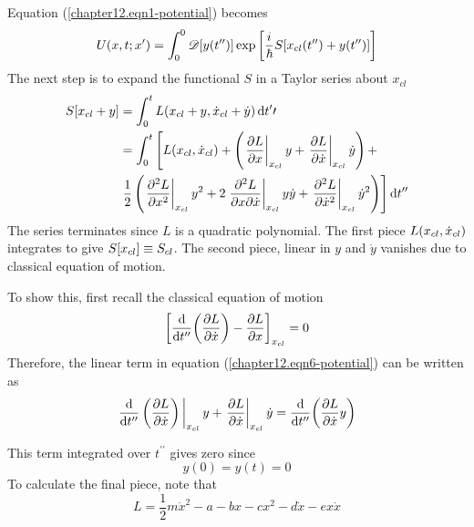 	Equation (\ref{chapter12.eqn1-potential}) becomes
	\begin{equation}
		U\qty(x,t;x^\prime) = \int_{0}^{0} \mathcal{D}\qty[y\qty(t^{\prime\prime})]  \exp\qty[\frac{{i\mkern1mu}}{\hbar} S\qty[x_{cl}\qty(t^{\prime\prime})  +  y\qty(t^{\prime\prime})]]
		\label{chapter12.eqn5-potential}
	\end{equation}
	The next step is to expand the functional $S$ in a Taylor series about $x_{cl}$
	\begin{align}
		\begin{split}
		S\qty[x_{cl} + y] 	&= \int_{0}^{t} L\qty(x_{cl} + y, \dot{x}_{cl} + \dot{y}) \dd{t^\prime\prime}\\
		&=
		\int_{0}^{t} \left[
		L(x_{cl}, \dot{x}_{cl})  + \left(\eval{\pdv{L}{x}}_{x_{cl}} y + \eval{\pdv{L}{\dot{x}}}_{x_{cl}} \dot{y}\right)
		+\right.
		\\ 
		&\left.
		 \frac{1}{2} \left(
		\eval{\pdv[2]{L}{x}}_{x_{cl}} y^2 
		+ 2 \eval{\pdv[2]{L}{x}{\dot{x}}}_{x_{cl}} y\dot{y} 
		+ \eval{\pdv[2]{L}{\dot{x}}}_{x_{cl}} \dot{y}^2		\right)
		\right] \dd{t^{\prime\prime}}
		\end{split}
		\label{chapter12.eqn6-potential}
	\end{align}
	The series terminates since $L$ is a quadratic polynomial.
	The first piece $L\qty(x_{cl}, \dot{x}_{cl})$ integrates to give $S\qty[x_{cl}] \equiv S_{cl}$. The second piece, linear in $y$ and $\dot{y}$ vanishes due to classical equation of motion.
		
		To show this, first recall the classical equation of motion
		\begin{equation}
			\left[
			\dv{t^{\prime\prime}} \qty(\pdv{L}{\dot{x}}) - \pdv{L}{x}
			\right]_{x_{cl}} = 0
		\end{equation}
		Therefore, the linear term in equation (\ref{chapter12.eqn6-potential}) can be written as
		\begin{equation}
			\eval{\dv{t^{\prime\prime}} \left(\pdv{L}{\dot{x}}\right)}_{x_{cl}} y + \eval{\pdv{L}{\dot{x}}}_{x_{cl}} \dot{y} = \dv{t^{\prime\prime}} \qty(\pdv{L}{\dot{x}} y)
		\end{equation}
		
		This term integrated over $t^{\prime\prime}$ gives zero since
		\begin{equation}
			y(0) = y(t) = 0
		\end{equation}
		To calculate the final piece, note that
		\begin{equation}
			L = \frac{1}{2} m \dot{x}^2 - a - b x - c x^2 - d \dot{x} - e x \dot{x}
			\label{chapter12.eqn7-potential}
		\end{equation}
		
